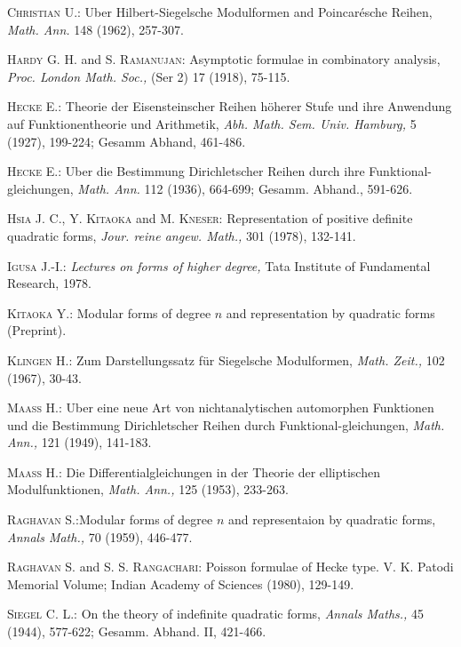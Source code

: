 \begin{thebibliography}{99}
 \textsc{Christian U.:} Uber Hilbert-Siegelsche Modulformen and Poincar\'esche Reihen, \textit{Math. Ann.} 148 (1962), 257-307.

 \textsc{Hardy G. H.} and \textsc{S. Ramanujan:} Asymptotic formulae in combinatory analysis, \textit{Proc. London Math. Soc.,} (Ser 2) 17 (1918), 75-115.

 \textsc{Hecke E.:} Theorie der Eisensteinscher Reihen h\"oherer Stufe und ihre Anwendung auf Funktionentheorie und Arithmetik, \textit{Abh. Math. Sem. Univ. Hamburg,} 5 (1927), 199-224; Gesamm Abhand, 461-486.

 \textsc{Hecke E.:} Uber die Bestimmung Dirichletscher Reihen durch ihre Funktional-gleichungen, \textit{Math. Ann.} 112 (1936), 664-699; Gesamm. Abhand., 591-626.

 \textsc{Hsia J. C., Y. Kitaoka} and \textsc{M. Kneser:} Representation of positive definite quadratic forms, \textit{Jour. reine angew. Math.,} 301 (1978), 132-141.

 \textsc{Igusa J.-I.:} \textit{Lectures on forms of higher degree,} Tata Institute of Fundamental Research, 1978.

 \textsc{Kitaoka Y.:} Modular forms of degree $n$ and representation by quadratic forms (Preprint).

 \textsc{Klingen H.:} Zum Darstellungssatz f\"ur Siegelsche Modulformen, \textit{Math. Zeit.,} 102 (1967), 30-43.

 \textsc{Maass H.:} Uber eine neue Art von nichtanalytischen automorphen Funktionen und die Bestimmung Dirichletscher Reihen durch Funktional-gleichungen, \textit{Math. Ann.,} 121 (1949), 141-183.

 \textsc{Maass H.:} Die Differentialgleichungen in der Theorie der elliptischen Modulfunktionen, \textit{Math. Ann.,} 125 (1953), 233-263.

 \textsc{Raghavan S.:}\pageoriginale Modular forms of degree $n$ and representaion by quadratic forms, \textit{Annals Math.,} 70 (1959), 446-477.

 \textsc{Raghavan S.} and \textsc{S. S. Rangachari:} Poisson formulae of Hecke type. V. K. Patodi Memorial Volume; Indian Academy of Sciences (1980), 129-149. 

 \textsc{Siegel C. L.:} On the theory of indefinite quadratic forms, \textit{Annals Maths.,} 45 (1944), 577-622; Gesamm. Abhand. II, 421-466.
\end{thebibliography}

















